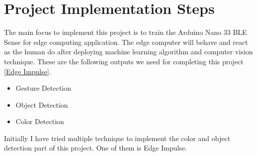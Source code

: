 %
%

\chapter{Project Implementation Steps}

The main focus to implement this project is to train the Arduino Nano 33 BLE Sense for edge computing application. The edge computer will behave and react as the human do after deploying machine learning algorithm and computer vision technique. These are the following outputs we need for completing this project \href{https://www.edgeimpulse.com/}{[Edge Impulse]}.
\begin{itemize}
	\item Gesture Detection
	\item Object Detection
	\item Color Detection
\end{itemize}
Initially I have tried multiple technique to implement the color and object detection part of this project. One of them is Edge Impulse.

